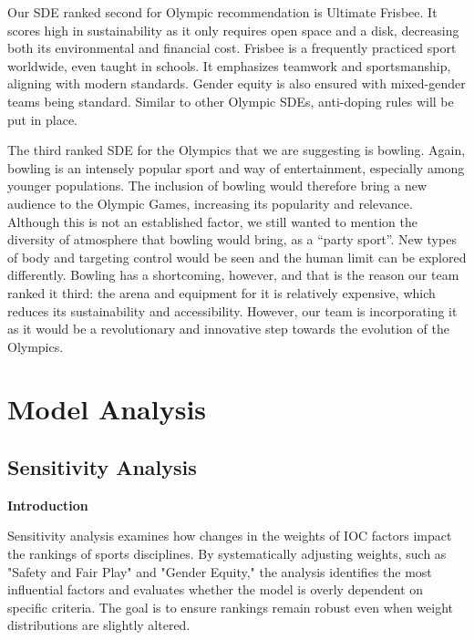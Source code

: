 \documentclass[12pt]{article}
\begin{document}
Our SDE ranked second for Olympic recommendation is Ultimate Frisbee. It scores high in sustainability as it only requires open space and a disk, decreasing both its environmental and financial cost. Frisbee is a frequently practiced sport worldwide, even taught in schools. It emphasizes teamwork and sportsmanship, aligning with modern standards. Gender equity is also ensured with mixed-gender teams being standard. Similar to other Olympic SDEs, anti-doping rules will be put in place. 

The third ranked SDE for the Olympics that we are suggesting is bowling. Again, bowling is an intensely popular sport and way of entertainment, especially among younger populations. The inclusion of bowling would therefore bring a new audience to the Olympic Games, increasing its popularity and relevance. Although this is not an established factor, we still wanted to mention the diversity of atmosphere that bowling would bring, as a “party sport”. New types of body and targeting control would be seen and the human limit can be explored differently. Bowling has a shortcoming, however, and that is the reason our team ranked it third: the arena and equipment for it is relatively expensive, which reduces its sustainability and accessibility. However, our team is incorporating it as it would be a revolutionary and innovative step towards the evolution of the Olympics.

\section{Model Analysis}

\subsection{Sensitivity Analysis}
\textbf{Introduction}

Sensitivity analysis examines how changes in the weights of IOC factors impact the rankings of sports disciplines. By systematically adjusting weights, such as "Safety and Fair Play" and "Gender Equity," the analysis identifies the most influential factors and evaluates whether the model is overly dependent on specific criteria. The goal is to ensure rankings remain robust even when weight distributions are slightly altered.
\end{document}
